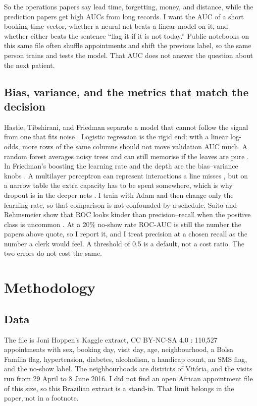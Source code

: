 \documentclass[conference]{IEEEtran}
\begin{document}
So the operations papers say lead time, forgetting, money, and distance, while the prediction papers get high AUCs from long records. I want the AUC of a short booking-time vector, whether a neural net beats a linear model on it, and whether either beats the sentence ``flag it if it is not today.'' Public notebooks on this same file often shuffle appointments and shift the previous label, so the same person trains and tests the model. That AUC does not answer the question about the next patient.

\subsection{Bias, variance, and the metrics that match the decision}
Hastie, Tibshirani, and Friedman separate a model that cannot follow the signal from one that fits noise \cite{hastie2009}. Logistic regression is the rigid end: with a linear log-odds, more rows of the same columns should not move validation AUC much. A random forest averages noisy trees and can still memorise if the leaves are pure \cite{breiman2001}. In Friedman's boosting the learning rate and the depth are the bias--variance knobs \cite{friedman2001}. A multilayer perceptron can represent interactions a line misses \cite{goodfellow2016}, but on a narrow table the extra capacity has to be spent somewhere, which is why dropout is in the deeper nets \cite{srivastava2014}. I train with Adam \cite{kingma2015} and then change only the learning rate, so that comparison is not confounded by a schedule. Saito and Rehmsmeier show that ROC looks kinder than precision--recall when the positive class is uncommon \cite{saito2015}. At a 20\% no-show rate ROC-AUC is still the number the papers above quote, so I report it, and I treat precision at a chosen recall as the number a clerk would feel. A threshold of 0.5 is a default, not a cost ratio. The two errors do not cost the same.

\section{Methodology}
\label{sec:method}
\subsection{Data}
The file is Joni Hoppen's Kaggle extract, CC BY-NC-SA 4.0 \cite{hoppen2016}: 110,527 appointments with sex, booking day, visit day, age, neighbourhood, a Bolsa Fam\'{i}lia flag, hypertension, diabetes, alcoholism, a handicap count, an SMS flag, and the no-show label. The neighbourhoods are districts of Vit\'{o}ria, and the visits run from 29 April to 8 June 2016. I did not find an open African appointment file of this size, so this Brazilian extract is a stand-in. That limit belongs in the paper, not in a footnote.
\end{document}
